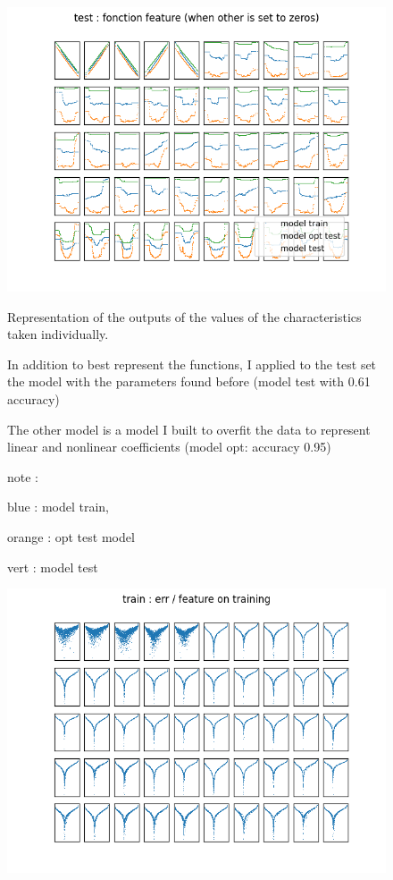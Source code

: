 \documentclass{article}
\begin{document}
\begin{figure}
\includegraphics[scale=1]{test_affichage_fonction.png}

Representation of the outputs of the values ​​of the characteristics taken individually.

In addition to best represent the functions, I applied to the test set the model with the parameters found before (model test with 0.61 accuracy)

The other model is a model I built to overfit the data to represent linear and nonlinear coefficients (model opt: accuracy 0.95)

note : 

blue : model train,

orange : opt test model 

vert : model test

\end{figure}

\newpage

\begin{figure}
\includegraphics[scale=1]{train_error_par_feature.png}
\end{figure}
\end{document}

